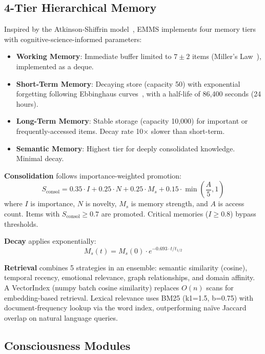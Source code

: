 \documentclass[conference]{IEEEtran}
\begin{document}
\subsection{4-Tier Hierarchical Memory}

Inspired by the Atkinson-Shiffrin model~\cite{atkinson1968}, EMMS implements four memory tiers with cognitive-science-informed parameters:

\begin{itemize}
    \item \textbf{Working Memory}: Immediate buffer limited to $7\pm2$ items (Miller's Law~\cite{miller1956}), implemented as a deque.
    \item \textbf{Short-Term Memory}: Decaying store (capacity 50) with exponential forgetting following Ebbinghaus curves~\cite{ebbinghaus1885}, with a half-life of 86,400 seconds (24 hours).
    \item \textbf{Long-Term Memory}: Stable storage (capacity 10,000) for important or frequently-accessed items. Decay rate 10$\times$ slower than short-term.
    \item \textbf{Semantic Memory}: Highest tier for deeply consolidated knowledge. Minimal decay.
\end{itemize}

\textbf{Consolidation} follows importance-weighted promotion:
\begin{equation}
    S_\text{consol} = 0.35 \cdot I + 0.25 \cdot N + 0.25 \cdot M_s + 0.15 \cdot \min\!\left(\frac{A}{5}, 1\right)
\end{equation}
where $I$ is importance, $N$ is novelty, $M_s$ is memory strength, and $A$ is access count. Items with $S_\text{consol} \geq 0.7$ are promoted. Critical memories ($I \geq 0.8$) bypass thresholds.

\textbf{Decay} applies exponentially:
\begin{equation}
    M_s(t) = M_s(0) \cdot e^{-0.693 \cdot t / t_{1/2}}
\end{equation}

\textbf{Retrieval} combines 5 strategies in an ensemble: semantic similarity (cosine), temporal recency, emotional relevance, graph relationships, and domain affinity. A VectorIndex (numpy batch cosine similarity) replaces $O(n)$ scans for embedding-based retrieval. Lexical relevance uses BM25 (k1=1.5, b=0.75) with document-frequency lookup via the word index, outperforming na\"ive Jaccard overlap on natural language queries.

\subsection{Consciousness Modules}
\end{document}
